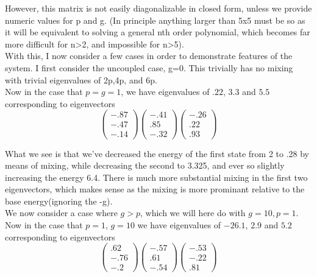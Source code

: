 \documentclass[11pt]{article} %
\begin{document}
However, this matrix is not easily diagonalizable in closed form, unless we provide numeric values for p and g. (In principle anything larger than 5x5 must be so as it will be equivalent to solving a general nth order polynomial, which becomes far more difficult for n>2, and impossible for n>5).\\

With this, I now consider a few cases in order to demonstrate features of the system. I first consider the uncoupled case, g=0. This trivially has no mixing with trivial eigenvalues of 2p,4p, and 6p. \\

Now in the case that $p =g=1$, we have eigenvalues of $.22$, $3.3$ and $5.5$ corresponding to eigenvectors\\

\begin{equation}
\left( \begin{matrix} -.87 \\ -.47 \\-.14 \end{matrix} \right)
\left( \begin{matrix} -.41 \\ .85 \\ -.32 \end{matrix} \right)
\left( \begin{matrix} -.26 \\ .22 \\ .93 \end{matrix} \right)
\end{equation}

What we see is that we've decreased the energy of the first state from 2 to .28 by means of mixing, while decreasing the second to 3.325, and ever so slightly increasing the energy 6.4. There is much more substantial mixing in the first two eigenvectors, which makes sense as the mixing is more prominant relative to the base energy(ignoring the -g).\\

We now consider a case where $g>p$, which we will here do with $g=10, p=1$. Now in the case that $p =1$, $g=10$ we have eigenvalues of $-26.1$, $2.9$ and $5.2$ corresponding to eigenvectors\\

\begin{equation}
\left( \begin{matrix} .62 \\ -.76 \\-.2 \end{matrix} \right)
\left( \begin{matrix} -.57 \\ .61 \\ -.54 \end{matrix} \right)
\left( \begin{matrix} -.53\\ -.22\\ .81 \end{matrix} \right)
\end{equation}
\end{document}
